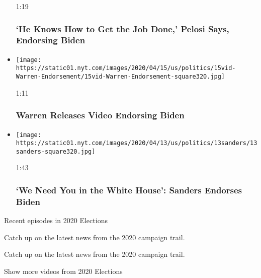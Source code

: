 \begin{itemize}
  1:19

  \hypertarget{he-knows-how-to-get-the-job-done-pelosi-says-endorsing-biden}{%
  \subsubsection{`He Knows How to Get the Job Done,' Pelosi Says,
  Endorsing
  Biden}\label{he-knows-how-to-get-the-job-done-pelosi-says-endorsing-biden}}
\item
  \href{https://www.nytimes.com/video/us/politics/100000007089056/warren-releases-video-endorsing-biden.html?action=click\&module=video-series-bar\&region=header\&pgtype=Article\&playlistId=video/2020-Elections}{}

  \texttt{[image: https://static01.nyt.com/images/2020/04/15/us/politics/15vid-Warren-Endorsement/15vid-Warren-Endorsement-square320.jpg]}

  1:11

  \hypertarget{warren-releases-video-endorsing-biden}{%
  \subsubsection{Warren Releases Video Endorsing
  Biden}\label{warren-releases-video-endorsing-biden}}
\item
  \href{https://www.nytimes.com/video/us/politics/100000007085637/sanders-endorses-biden.html?action=click\&module=video-series-bar\&region=header\&pgtype=Article\&playlistId=video/2020-Elections}{}

  \texttt{[image: https://static01.nyt.com/images/2020/04/13/us/politics/13sanders/13sanders-square320.jpg]}

  1:43

  \hypertarget{we-need-you-in-the-white-house-sanders-endorses-biden}{%
  \subsubsection{`We Need You in the White House': Sanders Endorses
  Biden}\label{we-need-you-in-the-white-house-sanders-endorses-biden}}
\end{itemize}

Recent episodes in 2020 Elections

Catch up on the latest news from the 2020 campaign trail.

Catch up on the latest news from the 2020 campaign trail.

Show more videos from 2020 Elections

\href{/video}{}

